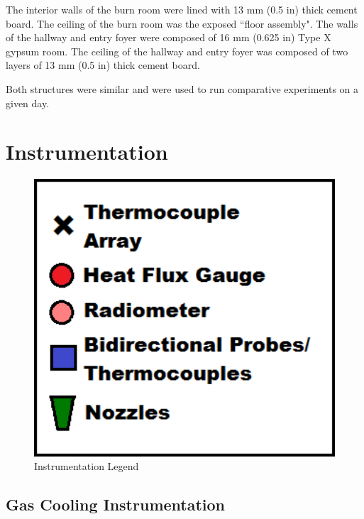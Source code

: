 \documentclass[12pt,oneside]{book}
\begin{document}
The interior walls of the burn room were lined with 13 mm (0.5 in) thick cement board.  The ceiling of the burn room was the exposed ``floor assembly".  The walls of the hallway and entry foyer were composed of 16 mm (0.625 in) Type X gypsum room. The ceiling of the hallway and entry foyer was composed of two layers of 13 mm (0.5 in) thick cement board.    

Both structures were similar and were used to run comparative experiments on a given day.

\section{Instrumentation}
\label{sec:Instrumentation}

\begin{figure}[!ht]
	\includegraphics[width=6in]{../Figures/Pictures/Legend2}
	\caption{Instrumentation Legend}
	\label{fig:Instrumentation_Legend}
\end{figure}

\subsection{Gas Cooling Instrumentation} 
\label{subsec:Gas_Cooling_Instrumentation}
\end{document}
